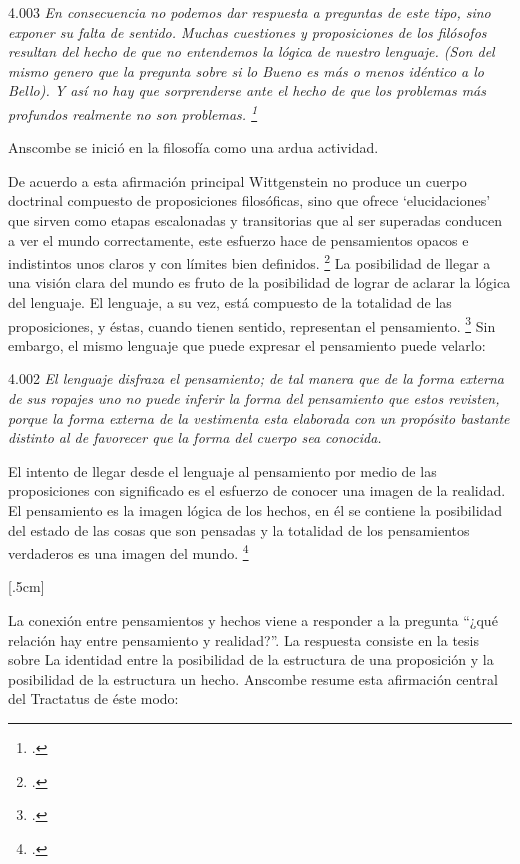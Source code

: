 4.003 \emph{En consecuencia no podemos dar respuesta a preguntas de este tipo, sino exponer su falta de sentido. Muchas cuestiones y proposiciones de los filósofos resultan del hecho de que no entendemos la lógica de nuestro lenguaje. (Son del mismo genero que la pregunta sobre si lo Bueno es más o menos idéntico a lo Bello). Y así no hay que sorprenderse ante el hecho de que los problemas más profundos realmente no son problemas. \footcite[4.003 p. 45]{tractatus}}

Anscombe se inició en la filosofía como una ardua actividad.

De acuerdo a esta afirmación principal Wittgenstein no produce un cuerpo doctrinal compuesto de proposiciones filosóficas, sino que ofrece `elucidaciones' que sirven como etapas escalonadas y transitorias que al ser superadas conducen a ver el mundo correctamente, este esfuerzo hace de pensamientos opacos e indistintos unos claros y con límites bien definidos. \footcite[cf. 4.112 y 6.54]{tractatus} La posibilidad de llegar a una visión clara del mundo es fruto de la posibilidad de lograr de aclarar la lógica del lenguaje. El lenguaje, a su vez, está compuesto de la totalidad de las proposiciones, y éstas, cuando tienen sentido, representan el pensamiento. \footcite[cf. 4 y 4.001]{tractatus} Sin embargo, el mismo lenguaje que puede expresar el pensamiento puede velarlo:

4.002 \emph{El lenguaje disfraza el pensamiento; de tal manera que de la forma externa de sus ropajes uno no puede inferir la forma del pensamiento que estos revisten, porque la forma externa de la vestimenta esta elaborada con un propósito bastante distinto al de favorecer que la forma del cuerpo sea conocida.}

El intento de llegar desde el lenguaje al pensamiento por medio de las proposiciones con significado es el esfuerzo de conocer una imagen de la realidad. El pensamiento es la imagen lógica de los hechos, en él se contiene la posibilidad del estado de las cosas que son pensadas y la totalidad de los pensamientos verdaderos es una imagen del mundo. \footcite[cf. 3 y 3.001]{tractatus}

[.5cm]

La conexión entre pensamientos y hechos viene a responder a la pregunta ``¿qué relación hay entre pensamiento y realidad?''. La respuesta consiste en la tesis sobre La identidad entre la posibilidad de la estructura de una proposición y la posibilidad de la estructura un hecho. Anscombe resume esta afirmación central del Tractatus de éste modo:

